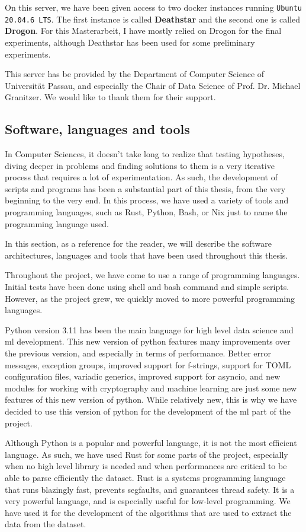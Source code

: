     On this server, we have been given access to two docker instances running \texttt{Ubuntu 20.04.6 LTS}. The first instance is called \textbf{Deathstar} and the second one is called \textbf{Drogon}. For this Masterarbeit, I have mostly relied on Drogon for the final experiments, although Deathstar has been used for some preliminary experiments. 

    This server has be provided by the Department of Computer Science of Universität Passau, and especially the Chair of Data Science of Prof. Dr. Michael Granitzer. We would like to thank them for their support.

    \subsection{Software, languages and tools}
    In Computer Sciences, it doesn't take long to realize that testing hypotheses, diving deeper in problems and finding solutions to them is a very iterative process that requires a lot of experimentation. As such, the development of scripts and programs has been a substantial part of this thesis, from the very beginning to the very end. In this process, we have used a variety of tools and programming languages, such as Rust, Python, Bash, or Nix just to name the programming language used.

    In this section, as a reference for the reader, we will describe the software architectures, languages and tools that have been used throughout this thesis.

    Throughout the project, we have come to use a range of programming languages. Initial tests have been done using shell and bash command and simple scripts. However, as the project grew, we quickly moved to more powerful programming languages. 

    Python version 3.11 has been the main language for high level data science and \acrshort{ml} development. This new version of python features many improvements over the previous version, and especially in terms of performance. Better error messages, exception groups, improved support for f-strings, support for TOML configuration files, variadic generics, improved support for asyncio, and new modules for working with cryptography and machine learning are just some new features of this new version of python. While relatively new, this is why we have decided to use this version of python for the development of the \acrshort{ml} part of the project.

    Although Python is a popular and powerful language, it is not the most efficient language. As such, we have used Rust for some parts of the project, especially when no high level library is needed and when performances are critical to be able to parse efficiently the dataset. Rust is a systems programming language that runs blazingly fast, prevents segfaults, and guarantees thread safety. It is a very powerful language, and is especially useful for low-level programming. We have used it for the development of the algorithms that are used to extract the data from the dataset.

